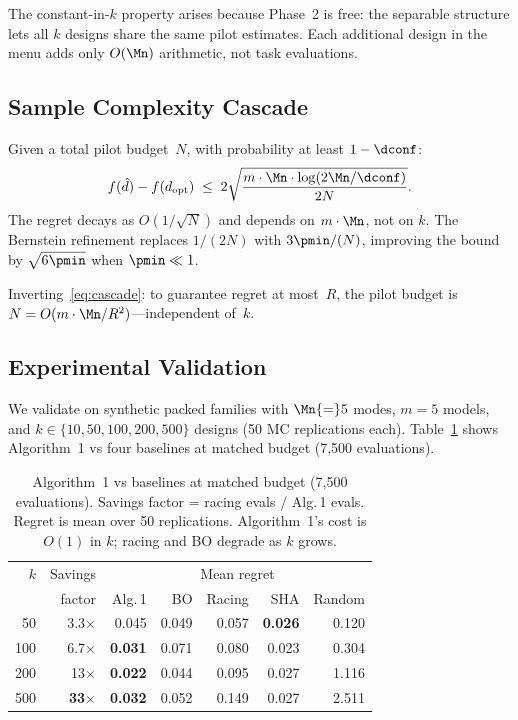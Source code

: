 The constant-in-$k$ property arises because Phase~2 is free: the
separable structure lets all $k$ designs share the same pilot estimates.
Each additional design in the menu adds only $O(\Mn)$ arithmetic, not
task evaluations.

\subsection{Sample Complexity Cascade}

\begin{proposition}
\label{prop:cascade}
Given a total pilot budget~$N$, with probability at least $1 - \dconf$:
\begin{equation}
\label{eq:cascade}
  f(\hat{d}) - f(d_{\mathrm{opt}})
  \;\le\;
  2\sqrt{\frac{m \cdot \Mn \cdot \log(2\Mn/\dconf)}{2N}}.
\end{equation}
The regret decays as $O(1/\sqrt{N})$ and depends on $m \cdot \Mn$, not
on $k$.  The Bernstein refinement replaces $1/(2N)$ with
$3\pmin/(N)$, improving the bound by $\sqrt{6\pmin}$ when $\pmin \ll 1$.
\end{proposition}

Inverting~\eqref{eq:cascade}: to guarantee regret at most~$R$, the pilot
budget is $N = O(m \cdot \Mn / R^2)$---independent of~$k$.

\subsection{Experimental Validation}
\label{sec:exp10}

We validate on synthetic packed families with $\Mn{=}5$ modes, $m{=}5$ models, and $k \in \{10, 50, 100, 200, 500\}$ designs (50 MC replications each). Table~\ref{tab:exp-combined} shows Algorithm~1 vs four baselines at matched budget (7,500 evaluations).

\begin{table}[t]
\centering
\caption{Algorithm~1 vs baselines at matched budget (7,500 evaluations). Savings factor = racing evals / Alg.\,1 evals. Regret is mean over 50 replications. Algorithm~1's cost is $O(1)$ in $k$; racing and BO degrade as $k$ grows.}
\label{tab:exp-combined}
\small
\begin{tabular}{@{}rrrrrrr@{}}
\toprule
$k$ & Savings & \multicolumn{5}{c}{Mean regret} \\
    & factor  & Alg.\,1 & BO & Racing & SHA & Random \\
\midrule
50  & 3.3$\times$  & 0.045 & 0.049 & 0.057 & \textbf{0.026} & 0.120 \\
100 & 6.7$\times$  & \textbf{0.031} & 0.071 & 0.080 & 0.023 & 0.304 \\
200 & 13$\times$   & \textbf{0.022} & 0.044 & 0.095 & 0.027 & 1.116 \\
500 & \textbf{33$\times$} & \textbf{0.032} & 0.052 & 0.149 & 0.027 & 2.511 \\
\bottomrule
\end{tabular}
\end{table}

